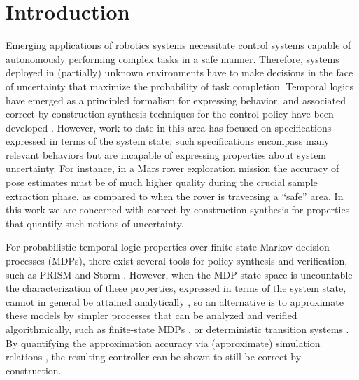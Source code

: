 \documentclass{ifacconf}
\newcommand{\new}[1]{{\color{blue}#1}}
\begin{document}
\section{Introduction}\label{subsec:intro}
Emerging applications of robotics systems necessitate control systems capable of autonomously performing complex tasks in a safe manner. Therefore, systems deployed in (partially) unknown environments have to make decisions in the face of uncertainty that maximize the probability of task completion. Temporal logics have emerged as a principled formalism for expressing behavior, and associated correct-by-construction synthesis techniques for the control policy have been developed \citep{Murray2009}. However, work to date in this area has focused on specifications expressed in terms of the system state; such specifications encompass many relevant behaviors but are incapable of expressing properties about system uncertainty. For instance, in a Mars rover exploration mission the accuracy of pose estimates must be of much higher quality during the crucial sample extraction phase, as compared to when the rover is traversing a ``safe'' area. In this work we are concerned with correct-by-construction synthesis for properties that quantify such notions of uncertainty.


For probabilistic temporal logic properties over finite-state Markov decision processes (MDPs), there exist several tools for policy synthesis and verification, such as PRISM \citep{KNP11} and  Storm \citep{dehnert2017storm}. However, when the MDP state space is uncountable the characterization of these properties, expressed in terms of the system state, cannot in general be attained analytically \citep{Abate1}, so an alternative is to approximate these models by simpler processes that can be analyzed and verified algorithmically, such as finite-state MDPs \citep{soudjani2015faust}, or deterministic transition systems \citep{Zamani2014}. \new{By quantifying the approximation accuracy via (approximate) simulation relations \citep{Zamani2014,haesaert2017verification,tech_report_TACAS}, the resulting controller can be shown to still be correct-by-construction.}
\end{document}
